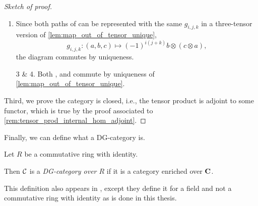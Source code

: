 \begin{proof}[Sketch of proof]
\begin{enumerate}
{\begin{center}
            \end{center}
            commutes.

            Let \( a \in A_i \) and \( b \in B_j \), and consider the following equation,
            \begin{align*}
                (g \otimes f)_{i + j} \circ s_{i + j} (a \otimes b) &= (g \otimes f)_{i + j} ((-1)^{ij}b \otimes a) \\
                &= (-1)^{ij} g_j(b) \otimes f_i(a) \\
                &= s_{i + j}(f_i(a) \otimes g_j(b)) \\
                &= s_{i + j} \circ (f \otimes g)_{i + j} (a \otimes b).
            \end{align*}
            By the above equation, along with the uniqueness of \autoref{lem:map_out_of_tensor_unique}, the above diagram commutes.
        }
        \item {
            Since both paths of \cite[Diagram 6.3]{Borceux_1994} can be represented with the same \( g_{i, j, k} \) in a three-tensor version of \autoref{lem:map_out_of_tensor_unique},
            \[
                g_{i, j, k}: (a, b, c) \mapsto (-1)^{i(j + k)}b \otimes (c \otimes a),
            \]
            the diagram commutes by uniqueness.
        }
        \item[3 \& 4.] {
            Both \cite[Diagram 6.4]{Borceux_1994}, and \cite[Diagram 6.5]{Borceux_1994} commute by uniqueness of \autoref{lem:map_out_of_tensor_unique}.
        }
    \end{enumerate}

    Third, we prove the category is closed, i.e., the tensor product is adjoint to some functor, which is true by the proof associated to \autoref{rem:tensor_prod_internal_hom_adjoint}.
\end{proof}

Finally, we can define what a DG-category is.

\begin{definition}[DG-category]
    \label{def:dg_cat}
    Let \( R \) be a commutative ring with identity.

    Then \( {\mathcal{C}} \) is a \emph{DG-category over \( R \)} if it is a category enriched over \( \operatorname{\mathbf{C}} \).
\end{definition}

This definition also appears in \cite[p.\ 29]{Jasso-Muro_2023}, except they define it for a field and not a commutative ring with identity as is done in this thesis.
